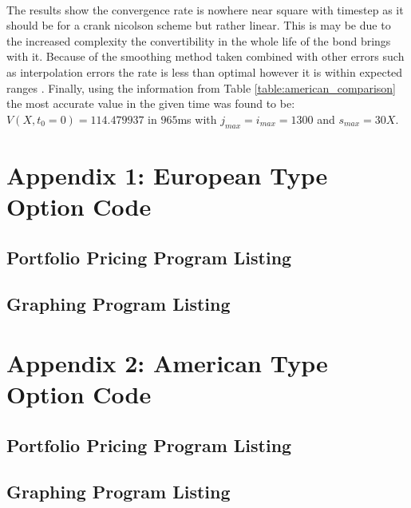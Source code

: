 \documentclass{article}
\begin{document}
\\
\par The results show the convergence rate is nowhere near square with timestep as it should be
for a crank nicolson scheme but rather linear.
This is may be due to the increased complexity the convertibility in the whole life of the
bond brings with it.
Because of the smoothing method taken combined with other errors such as interpolation errors
the rate is less than optimal however it is within expected ranges \cite{li2005pricing}.
Finally, using the information from Table \ref{table:american_comparison} the most accurate value in the given time was found to be:
$V(X,t_0=0)=114.479937$ in $965$ms with $j_{max}=i_{max}=1300$ and $s_{max}=30X$.


\clearpage
\section*{Appendix 1: European Type Option Code}
\lstset{style=mystyle}
\subsection*{Portfolio Pricing Program Listing}

\subsection*{Graphing Program Listing}

\clearpage
\section*{Appendix 2: American Type Option Code}
\lstset{style=mystyle}
\subsection*{Portfolio Pricing Program Listing}

\subsection*{Graphing Program Listing}

\end{document}

